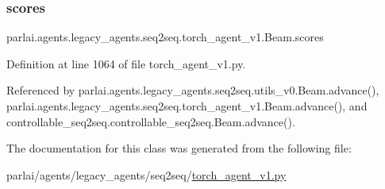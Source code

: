 \subsubsection{\texorpdfstring{scores}{scores}}
{\footnotesize\ttfamily parlai.\+agents.\+legacy\+\_\+agents.\+seq2seq.\+torch\+\_\+agent\+\_\+v1.\+Beam.\+scores}



Definition at line 1064 of file torch\+\_\+agent\+\_\+v1.\+py.



Referenced by parlai.\+agents.\+legacy\+\_\+agents.\+seq2seq.\+utils\+\_\+v0.\+Beam.\+advance(), parlai.\+agents.\+legacy\+\_\+agents.\+seq2seq.\+torch\+\_\+agent\+\_\+v1.\+Beam.\+advance(), and controllable\+\_\+seq2seq.\+controllable\+\_\+seq2seq.\+Beam.\+advance().



The documentation for this class was generated from the following file\+:\begin{DoxyCompactItemize}
\item 
parlai/agents/legacy\+\_\+agents/seq2seq/\hyperlink{torch__agent__v1_8py}{torch\+\_\+agent\+\_\+v1.\+py}\end{DoxyCompactItemize}
